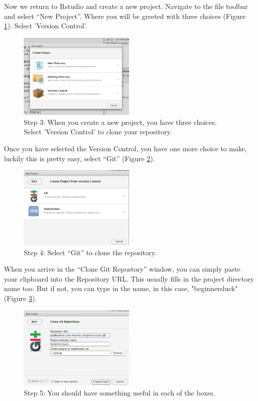 \documentclass[12pt]{../SOP4_alpha}\usepackage[]{graphicx}\usepackage[]{color}
\begin{document}
\NP Now we return to Rstudio and create a new project. Navigate to the file toolbar and select ``New Project''. Where you will be greeted with three choices (Figure \ref{fig:step3}). Select 'Version Control'. 
\begin{figure}[H]
\centering
\includegraphics[width=0.5\textwidth]{graphics/RstudioNewProject.jpg}
\caption{Step 3: When you create a new project, you have three choices. Select 'Version Control' to clone your repository.}
\label{fig:step3}
\end{figure}

\NP Once you have selected the Version Control, you have one more choice to make, luckily this is pretty easy, select ``Git'' (Figure \ref{fig:step4}).

\begin{figure}[H]
\centering
\includegraphics[width=0.5\textwidth]{graphics/RstudioNewProject2.jpg}
\caption{Step 4: Select ``Git'' to clone the repository.}
\label{fig:step4}
\end{figure}

When you arrive in the ``Clone Git Repostory'' window, you can simply paste your clipboard into the Repository URL. This usually fills in the project directory name too. But if not, you can type in the name, in this case, "beginnersluck" (Figure \ref{fig:step5}).

\begin{figure}[H]
\centering
\includegraphics[width=0.5\textwidth]{graphics/RstudioNewProject3.jpg}
\caption{Step 5: You should have something useful in each of the boxes.}
\label{fig:step5}
\end{figure}
\end{document}
